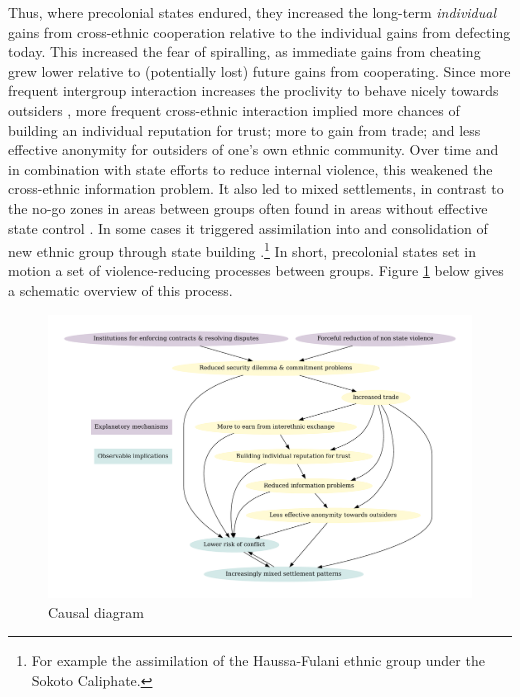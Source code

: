 Thus, where precolonial states endured, they increased the long-term
\textit{individual} gains from cross-ethnic cooperation relative to the
individual gains from defecting today. This increased the fear of spiralling, as
immediate gains from cheating grew lower relative to (potentially lost) future
gains from cooperating. Since more frequent intergroup interaction increases the
proclivity to behave nicely towards outsiders \citep[721]{Fearon_1996}, more
frequent cross-ethnic interaction implied more chances of building an individual
reputation for trust; more to gain from trade; and less effective anonymity for
outsiders of one’s own ethnic community. Over time and in combination with state
efforts to reduce internal violence, this weakened the cross-ethnic information
problem. It also led to mixed settlements, in contrast to the no-go zones in
areas between groups often found in areas without effective state control
\citep{diamond2013world}. In some cases it triggered assimilation into and
consolidation of new ethnic group through state building
\citep{Anderson2006}.\footnote{For example the assimilation of the Haussa-Fulani
ethnic group under the Sokoto Caliphate.} In short, precolonial states set in
motion a set of violence-reducing processes between groups. Figure \ref{causal}
below gives a schematic overview of this process.

\begin{figure}[hbtp]
	\centering
	\includegraphics[width=1\linewidth]{img/OMTcausal.pdf}
	\caption{Causal diagram}
	\label{causal}
\end{figure}

